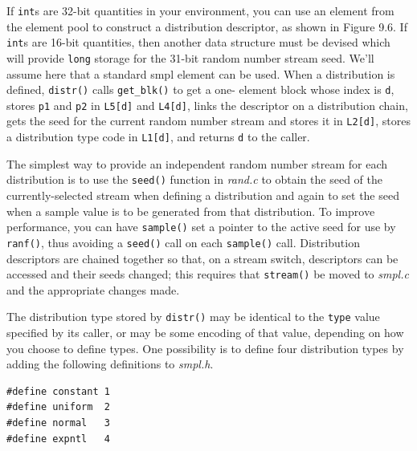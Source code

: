 If \texttt{int}s are 32-bit quantities in your environment, you can use an element
from the element pool to construct a distribution descriptor, as shown in
Figure 9.6. If \texttt{int}s are 16-bit quantities, then another data structure must be
devised which will provide \texttt{long} storage for the 31-bit random number
stream seed. We'll assume here that a standard smpl element can be used.
When a distribution is defined, \texttt{distr()} calls \texttt{get\_blk()} to get a one-
element block whose index is \texttt{d}, stores \texttt{p1} and \texttt{p2} in \texttt{L5[d]} and \texttt{L4[d]}, links
the descriptor on a distribution chain, gets the seed for the current random
number stream and stores it in \texttt{L2[d]}, stores a distribution type code in
\texttt{L1[d]}, and returns \texttt{d} to the caller.

The simplest way to provide an independent random number stream for
each distribution is to use the \texttt{seed()} function in \emph{rand.c} to obtain the seed of
the currently-selected stream when defining a distribution and again to set
the seed when a sample value is to be generated from that distribution. To
improve performance, you can have \texttt{sample()} set a pointer to the active
seed for use by \texttt{ranf()}, thus avoiding a \texttt{seed()} call on each \texttt{sample()} call.
Distribution descriptors are chained together so that, on a stream switch,
descriptors can be accessed and their seeds changed; this requires that
\texttt{stream()} be moved to \emph{smpl.c} and the appropriate changes made.

The distribution type stored by \texttt{distr()} may be identical to the \texttt{type}
value specified by its caller, or may be some encoding of that value, depending
on how you choose to define types. One possibility is to define four
distribution types by adding the following definitions to \emph{smpl.h}.
\begin{verbatim}
#define constant 1
#define uniform  2
#define normal   3
#define expntl   4
\end{verbatim}

